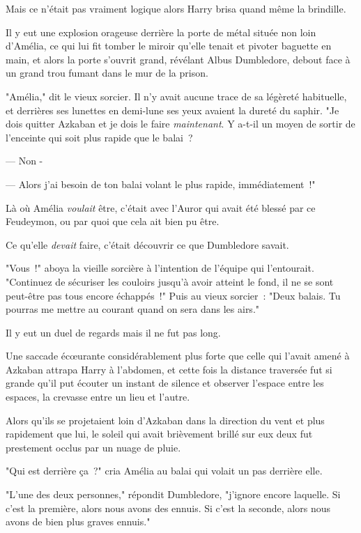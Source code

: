 Mais ce n'était pas vraiment logique alors Harry brisa quand même la brindille.

\later

Il y eut une explosion orageuse derrière la porte de métal située non loin d'Amélia, ce qui lui fit tomber le miroir qu'elle tenait et pivoter baguette en main, et alors la porte s'ouvrit grand, révélant Albus Dumbledore, debout face à un grand trou fumant dans le mur de la prison.

"Amélia," dit le vieux sorcier. Il n'y avait aucune trace de sa légèreté habituelle, et derrières ses lunettes en demi-lune ses yeux avaient la dureté du saphir. "Je dois quitter Azkaban et je dois le faire \emph{maintenant}. Y a-t-il un moyen de sortir de l'enceinte qui soit plus rapide que le balai~?

--- Non -

--- Alors j'ai besoin de ton balai volant le plus rapide, immédiatement~!"

Là où Amélia \emph{voulait} être, c'était avec l'Auror qui avait été blessé par ce Feudeymon, ou par quoi que cela ait bien pu être.

Ce qu'elle \emph{devait} faire, c'était découvrir ce que Dumbledore savait.

"Vous~!" aboya la vieille sorcière à l'intention de l'équipe qui l'entourait. "Continuez de sécuriser les couloirs jusqu'à avoir atteint le fond, il ne se sont peut-être pas tous encore échappés~!" Puis au vieux sorcier~: "Deux balais. Tu pourras me mettre au courant quand on sera dans les airs."

Il y eut un duel de regards mais il ne fut pas long.

\later

Une saccade écœurante considérablement plus forte que celle qui l'avait amené à Azkaban attrapa Harry à l'abdomen, et cette fois la distance traversée fut si grande qu'il put écouter un instant de silence et observer l'espace entre les espaces, la crevasse entre un lieu et l'autre.

\later

Alors qu'ils se projetaient loin d'Azkaban dans la direction du vent et plus rapidement que lui, le soleil qui avait brièvement brillé sur eux deux fut prestement occlus par un nuage de pluie.

"Qui est derrière ça~?" cria Amélia au balai qui volait un pas derrière elle.

"L'une des deux personnes," répondit Dumbledore, "j'ignore encore laquelle. Si c'est la première, alors nous avons des ennuis. Si c'est la seconde, alors nous avons de bien plus graves ennuis."

